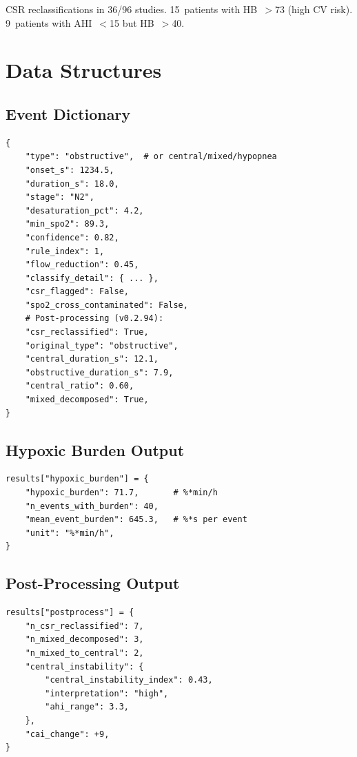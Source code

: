 \documentclass[11pt,a4paper]{article}
\begin{document}
 CSR reclassifications in 36/96 studies. 15~patients with
HB~$>$73 (high CV risk). 9~patients with AHI~$<$15 but HB~$>$40.

\section{Data Structures}

\subsection{Event Dictionary}
\begin{lstlisting}
{
    "type": "obstructive",  # or central/mixed/hypopnea
    "onset_s": 1234.5,
    "duration_s": 18.0,
    "stage": "N2",
    "desaturation_pct": 4.2,
    "min_spo2": 89.3,
    "confidence": 0.82,
    "rule_index": 1,
    "flow_reduction": 0.45,
    "classify_detail": { ... },
    "csr_flagged": False,
    "spo2_cross_contaminated": False,
    # Post-processing (v0.2.94):
    "csr_reclassified": True,
    "original_type": "obstructive",
    "central_duration_s": 12.1,
    "obstructive_duration_s": 7.9,
    "central_ratio": 0.60,
    "mixed_decomposed": True,
}
\end{lstlisting}

\subsection{Hypoxic Burden Output}
\begin{lstlisting}
results["hypoxic_burden"] = {
    "hypoxic_burden": 71.7,       # %*min/h
    "n_events_with_burden": 40,
    "mean_event_burden": 645.3,   # %*s per event
    "unit": "%*min/h",
}
\end{lstlisting}

\subsection{Post-Processing Output}
\begin{lstlisting}
results["postprocess"] = {
    "n_csr_reclassified": 7,
    "n_mixed_decomposed": 3,
    "n_mixed_to_central": 2,
    "central_instability": {
        "central_instability_index": 0.43,
        "interpretation": "high",
        "ahi_range": 3.3,
    },
    "cai_change": +9,
}
\end{lstlisting}
\end{document}
